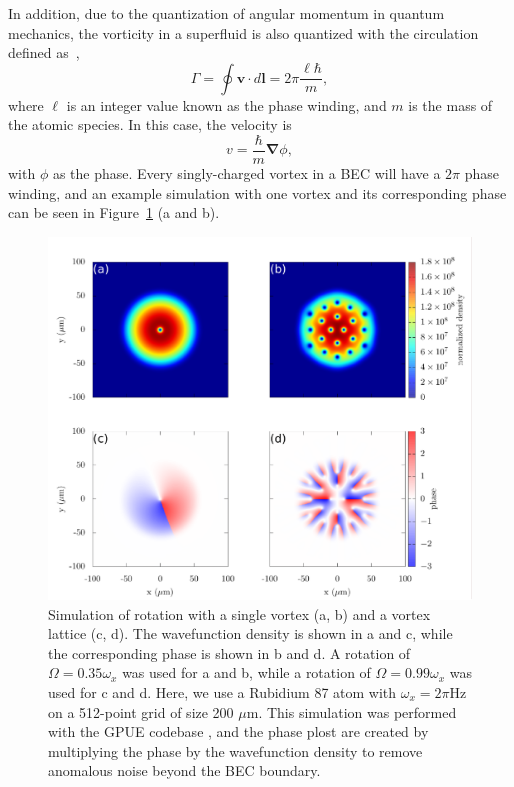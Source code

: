 In addition, due to the quantization of angular momentum in quantum mechanics, the vorticity in a superfluid is also quantized with the circulation defined as~\cite{Pethick2002},
\begin{equation}
\Gamma = \oint\mathbf{v} \cdot d \mathbf{l} = 2\pi \frac{\ell \hbar}{m},
\label{Eq:phase}
\end{equation}
where $\ell$ is an integer value known as the phase winding, and $m$ is the mass of the atomic species.
In this case, the velocity is
\begin{equation}
v = \frac{\hbar}{m}\mathbf{\nabla}\phi,
\end{equation}
with $\phi$ as the phase.
Every singly-charged vortex in a BEC will have a $2\pi$ phase winding, and an example simulation with one vortex and its corresponding phase can be seen in Figure~\ref{fig:rot} (a and b).

\begin{figure}

\includegraphics[width=\textwidth]{data/splitop/rot/WIP.pdf}

\caption{
Simulation of rotation with a single vortex (a, b) and a vortex lattice (c, d).
The wavefunction density is shown in a and c, while the corresponding phase is shown in b and d.
A rotation of $\Omega = 0.35\omega_x$ was used for a and b, while a rotation of $\Omega = 0.99\omega_x$ was used for c and d.
Here, we use a Rubidium 87 atom with $\omega_x = 2\pi$Hz on a 512-point grid of size 200 $\mu$m.
This simulation was performed with the GPUE codebase \cite{schloss2018}, and the phase plost are created by multiplying the phase by the wavefunction density to remove anomalous noise beyond the BEC boundary.
}
\label{fig:rot}
\end{figure}


